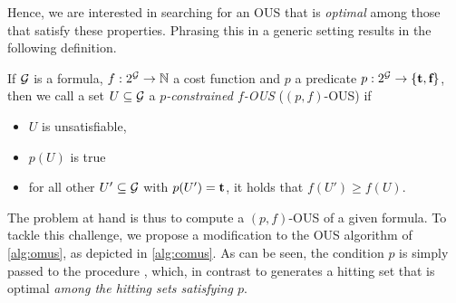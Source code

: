 Hence, we are interested in searching for an OUS that is \emph{optimal} among those that satisfy these properties. 
Phrasing this in a generic setting results in the following definition.

\begin{definition}
    If $\mathcal{G} $ is a formula, $f:2^{\mathcal{G} } \to \mathbb{N}$ a cost function and  $p$ a predicate $p: 2^{\mathcal{G} }\to \{\textbf{t},\textbf{f}\}$, then we call a set $U\subseteq \mathcal{G} $ a \emph{$p$-constrained $f$-OUS} ($(p,f)$-OUS) if \begin{itemize}                                                                                                                                                                                                                         
    \item $U$ is unsatisfiable,
    \item $p(U)$ is true
    \item for all other $U'\subseteq \mathcal{G} $ with $p(U')=\textbf{t}$, it holds that $f(U')\geq f(U)$.                                                                                                                                                                                                                         \end{itemize}
\end{definition}

The problem at hand is thus to compute a $(p,f)$-OUS of a given formula. 
To tackle this challenge, we propose a modification to the OUS algorithm of \cref{alg:omus}, as depicted in \cref{alg:comus}. 
As can be seen, the condition $p$ is simply passed to the procedure \cohs, which, in contrast to \ohs generates a hitting set that is optimal \emph{among the hitting sets satisfying $p$}.

